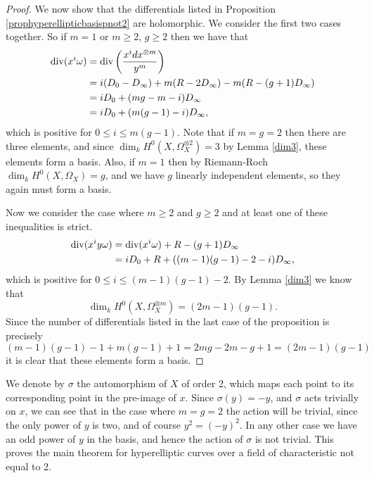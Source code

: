 \begin{proof}
    We now show that the differentials listed in Proposition \ref{prophyperellipticbasispnot2} are holomorphic.
    We consider the first two cases together.
    So if $m=1$ or $m\geq 2$, $g\geq 2$ then we have that
        \begin{align*}
        \operatorname{div}(x^i\omega) & =  \operatorname{div} \left( \frac{x^idx^{\otimes m}}{y^m} \right)\\ 
        & =  i(D_0 -D_\infty) + m(R-2D_\infty) -m(R-(g+1)D_\infty) \\
        & =  iD_0 + (mg -m -i)D_\infty \\
        & =  iD_0 + (m(g-1) -i)D_\infty,
        \end{align*}
    which is positive for $0\leq i \leq m(g-1)$.
    Note that if $m=g=2$ then there are three elements, and since $\dim_kH^0(X,\Omega_X^{\otimes 2})=3$ by Lemma \ref{dim3}, these elements form a basis.
    Also, if $m=1$ then by Riemann-Roch $\dim_k H^0(X,\Omega_X)=g$, and we have $g$ linearly independent elements, so they again must form a basis.
    
    
    
    Now we consider the case where $m\geq 2$ and $g \geq 2$ and at least one of these inequalities is strict.
        \begin{align*}
        \operatorname{div} (x^iy\omega) & =  \operatorname{div}(x^i\omega) + R -(g+1)D_\infty \\
        & =  iD_0 + R +((m-1)(g-1)-2-i)D_\infty,
        \end{align*}
    which is positive for $0\leq i \leq (m-1)(g-1)-2$.
    By Lemma \ref{dim3} we know that 
        \[
        \dim_kH^0(X,\Omega_X^{\otimes m}) = (2m-1)(g-1).
        \]
    Since the number of differentials listed in the last case of the proposition is precisely
        \[
        (m-1)(g-1)-1 + m(g-1) +1 = 2mg -2m -g + 1 = (2m-1)(g-1)
        \]
    it is clear that these elements form a basis.
    \end{proof}

We denote by $\sigma$ the automorphism of $X$ of order 2, which maps each point to its corresponding point in the pre-image of $x$.
Since $\sigma(y) = -y$, and $\sigma$ acts trivially on $x$, we can see that in the case where $m=g=2$ the action will be trivial, since the only power of $y$ is two, and of course $y^2 = (-y)^2$.
In any other case we have an odd power of $y$ in the basis, and hence the action of $\sigma$ is not trivial.
This proves the main theorem for hyperelliptic curves over a field of characteristic not equal to 2.




